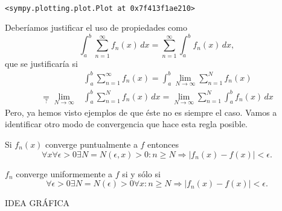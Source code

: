     \begin{center}
    \end{center}
    { \hspace*{\fill} \\}
    
            \begin{tcolorbox}[breakable, boxrule=.5pt, size=fbox, pad at break*=1mm, opacityfill=0]
\begin{Verbatim}[commandchars=\\\{\}]
<sympy.plotting.plot.Plot at 0x7f413f1ae210>
\end{Verbatim}
\end{tcolorbox}


Deberíamos justificar el uso de propiedades como 
\[
\int_a^b \sum\limits_{n=1}^{\infty} f_n(x)\,dx=\sum\limits_{n=1}^{\infty} \int_a^b f_n(x)\,dx,
\]
que se justificar\'ia  si 
\[
\begin{split}
&\int_a^b \sum\limits_{n=1}^{\infty} f_n(x)= \int_a^b \lim\limits_{N \to \infty} \sum\limits_{n=1}^{N}f_n(x)
\\
\underset{?}{=}
\lim\limits_{N \to \infty} &\int_a^b \sum\limits_{n=1}^{N} f_n(x)\,dx=
\lim\limits_{N \to \infty} \sum\limits_{n=1}^N \int_a^b f_n(x)\,dx
\end{split}
\]
Pero, ya hemos visto ejemplos de que éste no es siempre el caso. 
Vamos a identificar otro modo de convergencia que hace esta regla posible. 

Si $f_n(x)$ converge puntualmente a $f$ entonces
\[
\forall x \forall \epsilon>0 \exists N=N(\epsilon, x)>0:
n\geq N\Rightarrow|f_n(x)-f(x)|<\epsilon.
\]

\begin{definicion}{}
$f_n$ converge uniformemente a $f$ si y sólo si
\[
\forall \epsilon>0 \exists N=N(\epsilon)>0 \forall x:
n\geq N\Rightarrow|f_n(x)-f(x)|<\epsilon.
\]
\end{definicion}
IDEA GRÁFICA 

